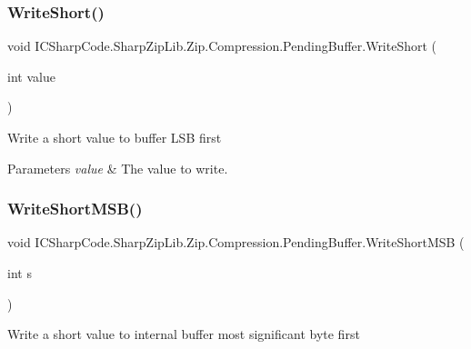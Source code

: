\subsubsection{\texorpdfstring{Write\+Short()}{WriteShort()}\hspace{0.1cm}{\footnotesize\ttfamily [2/2]}}
{\footnotesize\ttfamily void I\+C\+Sharp\+Code.\+Sharp\+Zip\+Lib.\+Zip.\+Compression.\+Pending\+Buffer.\+Write\+Short (\begin{DoxyParamCaption}\item[{int}]{value }\end{DoxyParamCaption})\hspace{0.3cm}{\ttfamily [inline]}}



Write a short value to buffer L\+SB first 


\begin{DoxyParams}{Parameters}
{\em value} & The value to write. \\
\hline
\end{DoxyParams}
\mbox{\label{class_i_c_sharp_code_1_1_sharp_zip_lib_1_1_zip_1_1_compression_1_1_pending_buffer_acb454c89e12f3795c186255ed5d950ab}} 
\subsubsection{\texorpdfstring{Write\+Short\+M\+S\+B()}{WriteShortMSB()}\hspace{0.1cm}{\footnotesize\ttfamily [1/2]}}
{\footnotesize\ttfamily void I\+C\+Sharp\+Code.\+Sharp\+Zip\+Lib.\+Zip.\+Compression.\+Pending\+Buffer.\+Write\+Short\+M\+SB (\begin{DoxyParamCaption}\item[{int}]{s }\end{DoxyParamCaption})\hspace{0.3cm}{\ttfamily [inline]}}



Write a short value to internal buffer most significant byte first 


